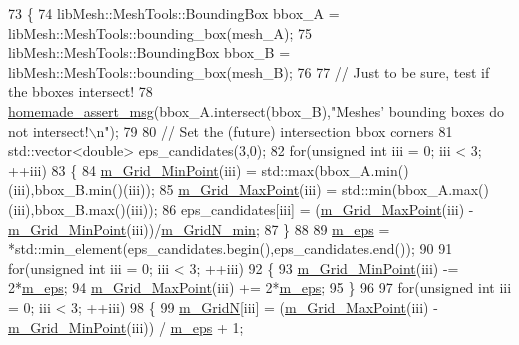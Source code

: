 \begin{DoxyCode}
73 \{
74     libMesh::MeshTools::BoundingBox bbox\_A = libMesh::MeshTools::bounding\_box(mesh\_A);
75     libMesh::MeshTools::BoundingBox bbox\_B = libMesh::MeshTools::bounding\_box(mesh\_B);
76 
77     \textcolor{comment}{// Just to be sure, test if the bboxes intersect!}
78     \hyperlink{common__header_8h_a593ccc80b790b2268653fcf6597bf451}{homemade\_assert\_msg}(bbox\_A.intersect(bbox\_B),\textcolor{stringliteral}{"Meshes' bounding boxes do not
       intersect!\(\backslash\)n"});
79 
80     \textcolor{comment}{// Set the (future) intersection bbox corners}
81     std::vector<double> eps\_candidates(3,0);
82     \textcolor{keywordflow}{for}(\textcolor{keywordtype}{unsigned} \textcolor{keywordtype}{int} iii = 0; iii < 3; ++iii)
83     \{
84         \hyperlink{classcarl_1_1_stitch___meshes_a7bf918ef98a9bc853afe749c44d35f35}{m\_Grid\_MinPoint}(iii) = std::max(bbox\_A.min()(iii),bbox\_B.min()(iii));
85         \hyperlink{classcarl_1_1_stitch___meshes_a06ac179f70188b5fed34f32e88a37787}{m\_Grid\_MaxPoint}(iii) = std::min(bbox\_A.max()(iii),bbox\_B.max()(iii));
86         eps\_candidates[iii] = (\hyperlink{classcarl_1_1_stitch___meshes_a06ac179f70188b5fed34f32e88a37787}{m\_Grid\_MaxPoint}(iii) - 
      \hyperlink{classcarl_1_1_stitch___meshes_a7bf918ef98a9bc853afe749c44d35f35}{m\_Grid\_MinPoint}(iii))/\hyperlink{classcarl_1_1_stitch___meshes_a573f149c7418656a45be9613d3183b5e}{m\_GridN\_min};
87     \}
88 
89     \hyperlink{classcarl_1_1_stitch___meshes_a1cbb52478197125ed915538dc9c717c2}{m\_eps} = *std::min\_element(eps\_candidates.begin(),eps\_candidates.end());
90 
91     \textcolor{keywordflow}{for}(\textcolor{keywordtype}{unsigned} \textcolor{keywordtype}{int} iii = 0; iii < 3; ++iii)
92     \{
93         \hyperlink{classcarl_1_1_stitch___meshes_a7bf918ef98a9bc853afe749c44d35f35}{m\_Grid\_MinPoint}(iii) -= 2*\hyperlink{classcarl_1_1_stitch___meshes_a1cbb52478197125ed915538dc9c717c2}{m\_eps};
94         \hyperlink{classcarl_1_1_stitch___meshes_a06ac179f70188b5fed34f32e88a37787}{m\_Grid\_MaxPoint}(iii) += 2*\hyperlink{classcarl_1_1_stitch___meshes_a1cbb52478197125ed915538dc9c717c2}{m\_eps};
95     \}
96 
97     \textcolor{keywordflow}{for}(\textcolor{keywordtype}{unsigned} \textcolor{keywordtype}{int} iii = 0; iii < 3; ++iii)
98     \{
99         \hyperlink{classcarl_1_1_stitch___meshes_a4213e0cfdaf9554971d75c6b811f4bdd}{m\_GridN}[iii] = (\hyperlink{classcarl_1_1_stitch___meshes_a06ac179f70188b5fed34f32e88a37787}{m\_Grid\_MaxPoint}(iii) - 
      \hyperlink{classcarl_1_1_stitch___meshes_a7bf918ef98a9bc853afe749c44d35f35}{m\_Grid\_MinPoint}(iii)) / \hyperlink{classcarl_1_1_stitch___meshes_a1cbb52478197125ed915538dc9c717c2}{m\_eps} + 1;

\end{DoxyCode}
